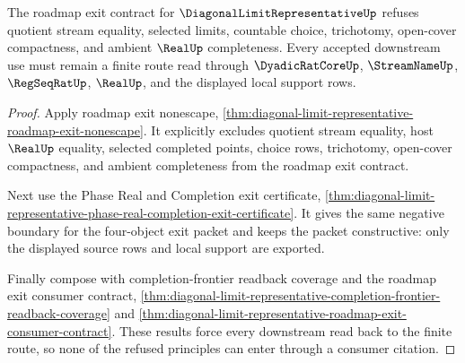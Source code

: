 \begin{theorem}
\label{thm:diagonal-limit-representative-exit-nonchoice-boundary}
The roadmap exit contract for $\DiagonalLimitRepresentativeUp$ refuses quotient stream equality, selected limits, countable choice, trichotomy, open-cover compactness, and ambient $\RealUp$ completeness. Every accepted downstream use must remain a finite route read through $\DyadicRatCoreUp$, $\StreamNameUp$, $\RegSeqRatUp$, $\RealUp$, and the displayed local support rows.
\end{theorem}
\begin{proof}
Apply roadmap exit nonescape, \autoref{thm:diagonal-limit-representative-roadmap-exit-nonescape}. It explicitly excludes quotient stream equality, host $\RealUp$ equality, selected completed points, choice rows, trichotomy, open-cover compactness, and ambient completeness from the roadmap exit contract.

Next use the Phase Real and Completion exit certificate, \autoref{thm:diagonal-limit-representative-phase-real-completion-exit-certificate}. It gives the same negative boundary for the four-object exit packet and keeps the packet constructive: only the displayed source rows and local support are exported.

Finally compose with completion-frontier readback coverage and the roadmap exit consumer contract, \autoref{thm:diagonal-limit-representative-completion-frontier-readback-coverage} and \autoref{thm:diagonal-limit-representative-roadmap-exit-consumer-contract}. These results force every downstream read back to the finite route, so none of the refused principles can enter through a consumer citation.
\end{proof}
